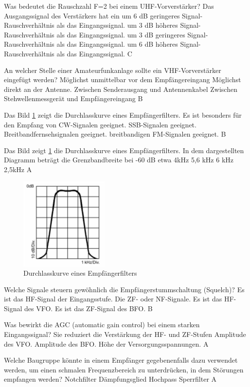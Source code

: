 {Was bedeutet die Rauschzahl F=2 bei einem UHF-Vorverstärker? Das Ausgangssignal des Verstärkers hat ein}%
{um 6 dB geringeres Signal-Rauschverhältnis als das Eingangssignal.}%
{um 3 dB höheres Signal-Rauschverhältnis als das Eingangssignal.}%
{um 3 dB geringeres Signal-Rauschverhältnis als das Eingangssignal.}%
{um 6 dB höheres Signal-Rauschverhältnis als das Eingangssignal.}%
{C}%

{An welcher Stelle einer Amateurfunkanlage sollte ein VHF-Vorverstärker eingefügt werden?}%
{Möglichst unmittelbar vor dem Empfängereingang}%
{Möglichst direkt an der Antenne.}%
{Zwischen Senderausgang und Antennenkabel}%
{Zwischen Stehwellenmessgerät und Empfängereingang}%
{B}%

{Das Bild \ref{Durchlasskurve} zeigt die Durchlasskurve eines Empfängerfilters.  Es ist besonders für den Empfang von}%
{CW-Signalen geeignet.}%
{SSB-Signalen geeignet.}%
{Breitbandfernsehsignalen geeignet.}%
{breitbandigen FM-Signalen geeignet.}%
{B}%

{Das Bild zeigt \ref{Durchlasskurve} die Durchlasskurve eines Empfängerfilters.  In dem dargestellten Diagramm beträgt die Grenzbandbreite bei -60 dB etwa}%
{4kHz}%
{5,6 kHz}%
{6 kHz}%
{2,5kHz}%
{A}%

\begin{figure}[H]
	\centering
	\includegraphics[scale=0.9]{Geraetetechnik/Bilder/TF410.png}
	\caption{Durchlasskurve eines Empfängerfilters}
	\label{Durchlasskurve}
	\end{figure}


{Welche Signale steuern gewöhnlich die Empfängerstummschaltung (Squelch)?}%
{Es ist das HF-Signal der Eingangsstufe.}%
{Die ZF- oder NF-Signale.}%
{Es ist das HF-Signal des VFO.}%
{Es ist das ZF-Signal des BFO.}%
{B}%

{Was bewirkt die AGC (automatic gain control) bei einem starken Eingangssignal? Sie reduziert die}%
{Verstärkung der HF- und ZF-Stufen}%
{Amplitude des VFO.}%
{Amplitude des BFO.}%
{Höhe der Versorgungsspannungen.}%
{A}%

{Welche Baugruppe könnte in einem Empfänger gegebenenfalls dazu verwendet werden, um einen schmalen Frequenzbereich zu unterdrücken, in dem Störungen empfangen werden?}%
{Notchfilter}%
{Dämpfungsglied}%
{Hochpass}%
{Sperrfilter}%
{A}%

